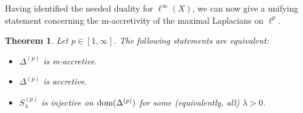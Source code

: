 \documentclass[letterpaper]{article}
\newtheorem{theorem}[lemma]{Theorem}
\theoremstyle{definition}
\theoremstyle{named}
\numberwithin{equation}{section}
\newcommand{\dom}{\textnormal{dom}} %
\newcommand{\Dep}{\Delta^{(p)}}
\newcommand{\Sep}{S_\lambda^{(p)}}
\begin{document}
Having identified the needed duality for $\ell^\infty(X)$, we can now
give a unifying statement concerning the m-accretivity of the maximal
Laplacians on $\ell^p$.

\begin{theorem}\label{t:acc_inj}
    Let $p \in [1,\infty]$. The following statements are equivalent: 
    \begin{itemize}
        \item[\textup{(i)}] $\Dep$ is m-accretive.
        \item[\textup{(ii)}] $\Dep$ is accretive.
        \item[\textup{(iii)}] $\Sep$ is injective on $\dom(\Delta^{(p)})$
        for some (equivalently, all) $\lambda >0$.
    \end{itemize}
\end{theorem}
\end{document}
